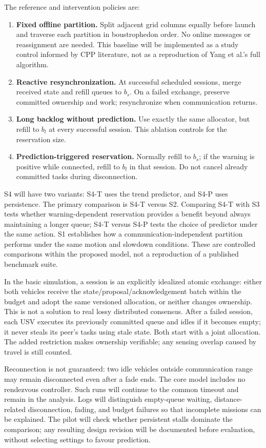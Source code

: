 The reference and intervention policies are:
\begin{enumerate}[label=\textbf{S\arabic*.}]
\item \textbf{Fixed offline partition.} Split adjacent grid columns equally before launch and traverse each partition in boustrophedon order. No online messages or reassignment are needed. This baseline will be implemented as a study control informed by CPP literature, not as a reproduction of Yang et al.'s full algorithm.
\item \textbf{Reactive resynchronization.} At successful scheduled sessions, merge received state and refill queues to $b_s$. On a failed exchange, preserve committed ownership and work; resynchronize when communication returns.
\item \textbf{Long backlog without prediction.} Use exactly the same allocator, but refill to $b_l$ at every successful session. This ablation controls for the reservation size.
\item \textbf{Prediction-triggered reservation.} Normally refill to $b_s$; if the warning is positive while connected, refill to $b_l$ in that session. Do not cancel already committed tasks during disconnection.
\end{enumerate}

S4 will have two variants: S4-T uses the trend predictor, and S4-P uses persistence. The primary comparison is S4-T versus S2. Comparing S4-T with S3 tests whether warning-dependent reservation provides a benefit beyond always maintaining a longer queue; S4-T versus S4-P tests the choice of predictor under the same action. S1 establishes how a communication-independent partition performs under the same motion and slowdown conditions. These are controlled comparisons within the proposed model, not a reproduction of a published benchmark suite.

In the basic simulation, a session is an explicitly idealized atomic exchange: either both vehicles receive the state/proposal/acknowledgement batch within the budget and adopt the same versioned allocation, or neither changes ownership. This is not a solution to real lossy distributed consensus. After a failed session, each USV executes its previously committed queue and idles if it becomes empty; it never steals its peer's tasks using stale state. Both start with a joint allocation. The added restriction makes ownership verifiable; any sensing overlap caused by travel is still counted.

Reconnection is not guaranteed: two idle vehicles outside communication range may remain disconnected even after a fade ends. The core model includes no rendezvous controller. Such runs will continue to the common timeout and remain in the analysis. Logs will distinguish empty-queue waiting, distance-related disconnection, fading, and budget failures so that incomplete missions can be explained. The pilot will check whether persistent stalls dominate the comparison; any resulting design revision will be documented before evaluation, without selecting settings to favour prediction.

